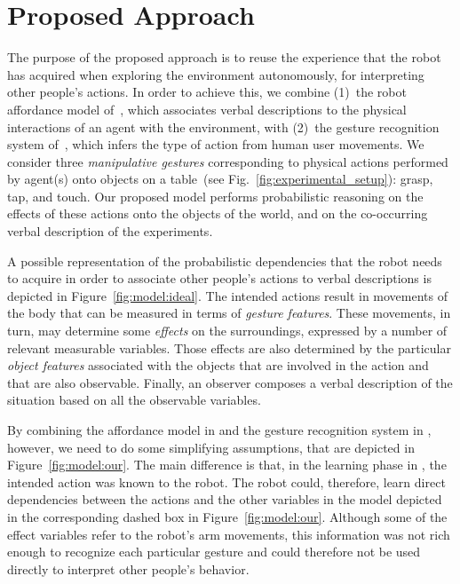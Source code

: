 \section{Proposed Approach}
The purpose of the proposed approach is to reuse the experience that the robot has acquired when exploring the environment autonomously, for interpreting other people's actions.
In order to achieve this, we combine (1)~the robot affordance model of~\cite{salvi:2012:smcb}, which associates verbal descriptions to the physical interactions of an agent with the environment, with (2)~the gesture recognition system of~\cite{saponaro:2013:crhri}, which infers the type of action from human user movements.
We consider three \emph{manipulative gestures} corresponding to physical actions performed by agent(s) onto objects on a table~(see Fig.~\ref{fig:experimental_setup}): grasp, tap, and touch.
Our proposed model performs probabilistic reasoning on the effects of these actions onto the objects of the world, and on the co-occurring verbal description of the experiments.

A possible representation of the probabilistic dependencies that the robot needs to acquire in order to associate other people's actions to verbal descriptions is depicted in Figure~\ref{fig:model:ideal}.
The intended actions result in movements of the body that can be measured in terms of \emph{gesture features}.
These movements, in turn, may determine some \emph{effects} on the surroundings, expressed by a number of relevant measurable variables.
Those effects are also determined by the particular \emph{object features} associated with the objects that are involved in the action and that are also observable.
Finally, an observer composes a verbal description of the situation based on all the observable variables.

By combining the affordance model in \cite{salvi:2012:smcb} and the gesture recognition system in \cite{saponaro:2013:crhri}, however, we need to do some simplifying assumptions, that are depicted in Figure~\ref{fig:model:our}.
The main difference is that, in the learning phase in \cite{salvi:2012:smcb}, the intended action was known to the robot.
The robot could, therefore, learn direct dependencies between the actions and the other variables in the \affword{} model depicted in the corresponding dashed box in Figure~\ref{fig:model:our}.
Although some of the effect variables refer to the robot's arm movements, this information was not rich enough to recognize each particular gesture and could therefore not be used directly to interpret other people's behavior.


